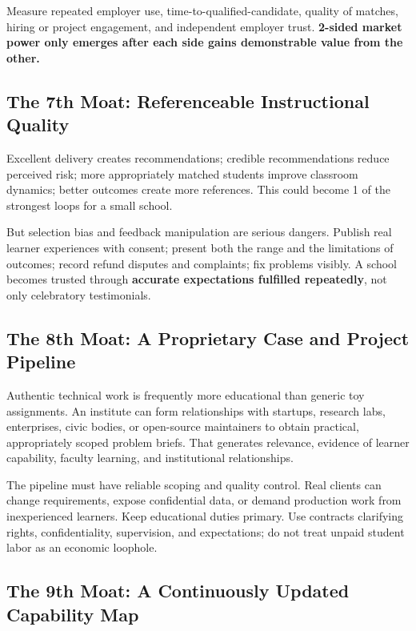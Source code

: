 Measure repeated employer use, time-to-qualified-candidate, quality of matches, hiring or project engagement, and independent employer trust. \textbf{2-sided market power only emerges after each side gains demonstrable value from the other.}

\subsection{The 7th Moat: Referenceable Instructional Quality}
\label{sec:seventh_moat_referenceable_quality}

Excellent delivery creates recommendations; credible recommendations reduce perceived risk; more appropriately matched students improve classroom dynamics; better outcomes create more references. This could become 1 of the strongest loops for a small school.

But selection bias and feedback manipulation are serious dangers. Publish real learner experiences with consent; present both the range and the limitations of outcomes; record refund disputes and complaints; fix problems visibly. A school becomes trusted through \textbf{accurate expectations fulfilled repeatedly}, not only celebratory testimonials.

\subsection{The 8th Moat: A Proprietary Case and Project Pipeline}
\label{sec:eighth_moat_project_pipeline}

Authentic technical work is frequently more educational than generic toy assignments. An institute can form relationships with startups, research labs, enterprises, civic bodies, or open-source maintainers to obtain practical, appropriately scoped problem briefs. That generates relevance, evidence of learner capability, faculty learning, and institutional relationships.

The pipeline must have reliable scoping and quality control. Real clients can change requirements, expose confidential data, or demand production work from inexperienced learners. Keep educational duties primary. Use contracts clarifying rights, confidentiality, supervision, and expectations; do not treat unpaid student labor as an economic loophole.

\subsection{The 9th Moat: A Continuously Updated Capability Map}
\label{sec:ninth_moat_updated_capability_map}

